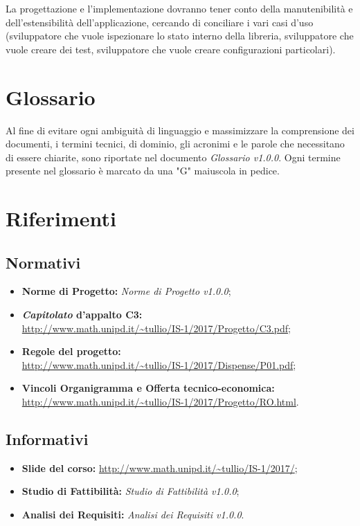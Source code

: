 \documentclass[../PianodiProgetto.tex]{subfiles}
\begin{document}
	\noindent La progettazione e l'implementazione dovranno tener conto della manutenibilità e dell'estensibilità dell'applicazione, cercando di conciliare i vari casi d'uso (sviluppatore che vuole ispezionare lo stato interno della libreria, sviluppatore che vuole creare dei test, sviluppatore che vuole creare configurazioni particolari). 
	
	\section{Glossario}
	Al fine di evitare ogni ambiguità di linguaggio e massimizzare la comprensione dei documenti, i termini tecnici, di dominio, gli acronimi e le parole che necessitano di essere chiarite, sono riportate nel documento \textit{Glossario v1.0.0}. Ogni termine presente nel glossario è marcato da una "G" maiuscola in pedice.
	
	\section{Riferimenti}
	
	\subsection{Normativi}
	\begin{itemize}
		\item \textbf{Norme di Progetto:} \textit{Norme di Progetto v1.0.0};
		\item \textbf{\textit{Capitolato} d'appalto C3:}\\ \url{http://www.math.unipd.it/~tullio/IS-1/2017/Progetto/C3.pdf};
		\item \textbf{Regole del progetto:}\\ \url{http://www.math.unipd.it/~tullio/IS-1/2017/Dispense/P01.pdf};
		\item \textbf{Vincoli Organigramma e Offerta tecnico-economica:}\\ \url{http://www.math.unipd.it/~tullio/IS-1/2017/Progetto/RO.html}.
	\end{itemize}
	
	\subsection{Informativi}
	\begin{itemize}
		\item \textbf{Slide del corso:} \url{http://www.math.unipd.it/~tullio/IS-1/2017/};
		\item \textbf{Studio di Fattibilità:} \textit{Studio di Fattibilità v1.0.0};
		\item \textbf{Analisi dei Requisiti:} \textit{Analisi dei Requisiti v1.0.0}.
	\end{itemize}
	
\end{document}
